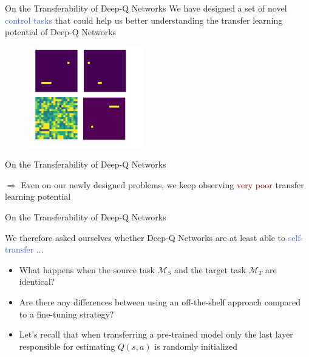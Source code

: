 \documentclass{beamer}
\begin{document}
\begin{frame}{On the Transferability of Deep-Q Networks}
	\bigskip
	We have designed a set of novel \textcolor{RoyalBlue}{control tasks} that could help us better understanding the transfer learning potential of Deep-Q Networks 
	\bigskip
	\begin{figure}[ht]
\begin{minipage}{0.5\textwidth}
	\centering
	\includegraphics[width=5cm]{./figures/catch_games}
\end{minipage}%
\begin{minipage}{0.5\textwidth}
	\centering
	
\end{minipage}
\label{fig:catch_baselines}
\end{figure}

\end{frame}

\begin{frame}{On the Transferability of Deep-Q Networks}

	\bigskip
	$\Rightarrow$ Even on our newly designed problems, we keep observing \textcolor{Maroon}{very poor} transfer learning potential
\begin{table}[ht!]
	\centering
	\caption{The area ratio obtained after fine-tuning a pre-trained DQN agent on the different \texttt{Catch} environments. We can see that no matter which source game is used for pre-training, transfer learning surprisingly never results in positive transfer.}
	
	\label{tab:catch_tl_area_ratio}
\end{table}

\end{frame}

\begin{frame}{On the Transferability of Deep-Q Networks}

	We therefore asked ourselves whether Deep-Q Networks are at least able to \textcolor{RoyalBlue}{self-transfer} ...
	\bigskip
	\begin{itemize}
		\item What happens when the source task $\mathcal{M}_S$ and the target task $\mathcal{M}_T$ are identical?
		\item Are there any differences between using an off-the-shelf approach compared to a fine-tuning strategy?
		\item Let's recall that when transferring a pre-trained model only the last layer responsible for estimating $Q(s,a)$ is randomly initialized
	\end{itemize}

\end{frame}
\end{document}
